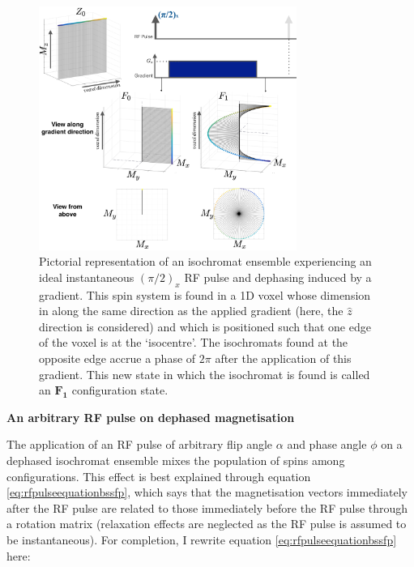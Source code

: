 \begin{figure}[ht]
    \centering
    \includegraphics[angle=0,width=0.75\textwidth, keepaspectratio]{images/mrf/oneblockfisp}
    \caption{Pictorial representation of an isochromat ensemble experiencing an ideal instantaneous $(\pi/2)_x$ RF pulse and dephasing induced by a gradient.
    This spin system is found in a 1D voxel whose dimension in along the same direction as the applied gradient (here, the $\hat{z}$ direction is considered) and which is positioned such that one edge of the voxel is at the `isocentre'. The isochromats found at the opposite edge accrue a phase of $2\pi$ after the application of this gradient.
    This new state in which the isochromat is found is called an $\bm{F_1}$ configuration state.
    }
    \label{fig:oneblockfisp}
\end{figure}

\hfill

\textbf{An arbitrary RF pulse on dephased magnetisation}

The application of an RF pulse of arbitrary flip angle $\alpha$ and phase angle $\phi$ on a dephased isochromat ensemble mixes the population of spins among configurations.
This effect is best explained through equation \ref{eq:rfpulseequationbssfp}, which says that the magnetisation vectors immediately after the RF pulse are related to those immediately before the RF pulse through a rotation matrix (relaxation effects are neglected as the RF pulse is assumed to be instantaneous).
For completion, I rewrite equation \ref{eq:rfpulseequationbssfp} here:

